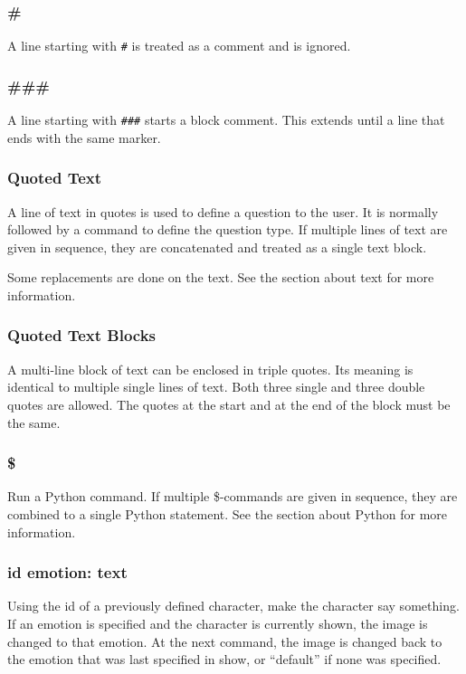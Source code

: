 \documentclass{article}
\begin{document}
\subsubsection{\#}
A line starting with \verb-#- is treated as a comment and is ignored.

\subsubsection{\#\#\#}
A line starting with \verb-###- starts a block comment. This extends until a
line that ends with the same marker.

\subsubsection{Quoted Text}
A line of text in quotes is used to define a question to the user. It is
normally followed by a command to define the question type. If multiple lines
of text are given in sequence, they are concatenated and treated as a single
text block.

Some replacements are done on the text. See the section about text for more
information.

\subsubsection{Quoted Text Blocks}
A multi-line block of text can be enclosed in triple quotes. Its meaning is
identical to multiple single lines of text. Both three single and three double
quotes are allowed. The quotes at the start and at the end of the block must be
the same.

\subsubsection{\$}
Run a Python command. If multiple \$-commands are given in sequence, they are
combined to a single Python statement. See the section about Python for more
information.

\subsubsection{id emotion: text}
Using the id of a previously defined character, make the character say
something. If an emotion is specified and the character is currently shown, the
image is changed to that emotion. At the next command, the image is changed
back to the emotion that was last specified in show, or ``default'' if none was
specified.
\end{document}

